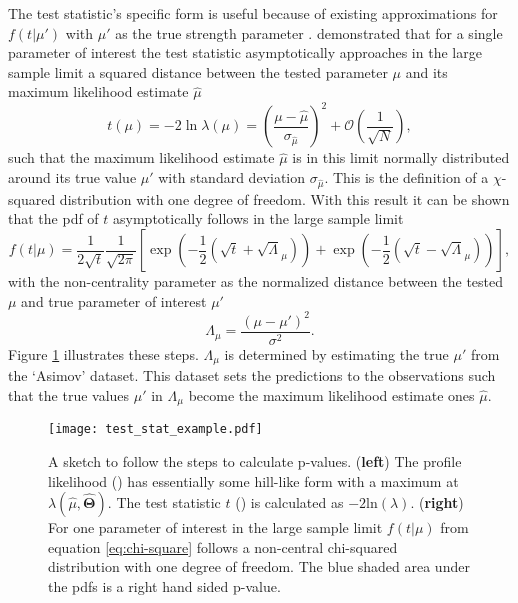 The test statistic's specific form is useful because of existing approximations for $f(t | \mu')$ with $\mu'$ as the true strength parameter \citep{cowan2011asymptotic}. 
\citet{wald1943tests} demonstrated that for a single parameter of interest the test statistic asymptotically approaches in the large sample limit a squared distance between the tested parameter $\mu$ and its maximum likelihood estimate $\hat{\mu}$
\begin{equation}
    t(\mu)=-2\ln \lambda(\mu)=
    \left(\frac{\mu-\hat{\mu}}{\sigma_{\hat{\mu}}} \right)^2
    + \mathcal{O}(\frac{1}{\sqrt{N}}),
\end{equation}
such that the maximum likelihood estimate $\hat{\mu}$ is in this limit normally distributed around its true value $\mu'$ with standard deviation $\sigma_{\hat{\mu}}$. This is the definition of a $\chi$-squared distribution with one degree of freedom. With this result it can be shown that \citep{cowan2011asymptotic} the \ac{pdf} of $t$ asymptotically follows in the large sample limit
\begin{equation}\label{eq:chi-square}
    f(t | \mu)=\frac{1}{2\sqrt{t}}\frac{1}{\sqrt{2\pi}}
    \left[
        \exp\left(-\frac{1}{2}\left(\sqrt{t}+\sqrt{\Lambda}_\mu\right)\right)
        +
        \exp\left(-\frac{1}{2}\left(\sqrt{t}-\sqrt{\Lambda}_\mu\right)\right)
        \right],
\end{equation}
with the non-centrality parameter as the normalized distance between the tested $\mu$ and true parameter of interest $\mu'$
\begin{equation}
    \Lambda_\mu=\frac{(\mu-\mu')^2}{\sigma^2}.
\end{equation}
Figure \ref{fig:test_stat_example} illustrates these steps. $\Lambda_\mu$ is determined by estimating the true $\mu'$ from the `Asimov' dataset. This dataset sets the predictions to the observations such that the true values $\mu'$ in $\Lambda_\mu$ become the maximum likelihood estimate ones $\hat{\mu}$.

\begin{figure}
    \centering
    \texttt{[image: test\_stat\_example.pdf]}
    \caption[]{A sketch to follow the steps to calculate p-values. (\textbf{left}) The profile likelihood ({\color[HTML]{1f77b4}{$\bm{\diagup}$}}) has essentially some hill-like form with a maximum at ${\lambda(\hat{\mu},\hat{\bm{\Theta}})}$. The test statistic $t$ ({\color[HTML]{ff7f0e}{$\bm{\diagup}$}}) is calculated as $-2\mathrm{ln}(\lambda)$. (\textbf{right}) For one parameter of interest in the large sample limit $f(t | \mu)$ from equation \ref{eq:chi-square} follows a non-central chi-squared distribution with one degree of freedom. The blue shaded area under the \acp{pdf} is a right hand sided p-value.}
    \label{fig:test_stat_example}
\end{figure}

